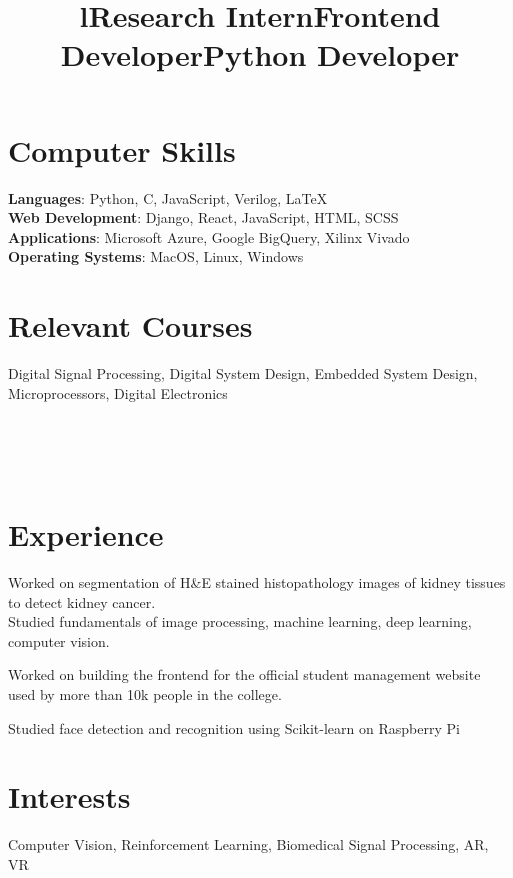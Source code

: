\documentclass[margin]{res}
\begin{document}
\begin{resume}
    \section{Computer Skills}
      \textbf{Languages}: Python, C, JavaScript, Verilog, \LaTeX
      \\
      \textbf{Web Development}: Django, React, JavaScript, HTML, SCSS
      \\
      \textbf{Applications}: Microsoft Azure, Google BigQuery, Xilinx Vivado
      \\
      \textbf{Operating Systems}: MacOS, Linux, Windows

    \section{Relevant Courses}
      Digital Signal Processing, Digital System Design, Embedded System Design,
      Microprocessors, Digital Electronics

    \begin{format}
      \title{l}\\
      \\
      \body\\
    \end{format}

    \section{Experience}
      \title{\textbf{Research Intern}}
      \begin{position}
        Worked on segmentation of H\&E stained histopathology images of kidney tissues to detect kidney cancer.\\
        Studied fundamentals of image processing, machine learning, deep learning, computer vision.
      \end{position}

      \title{\textbf{Frontend Developer}}
      \begin{position}
        Worked on building the frontend for the official student management website used by more than 10k people in the college.
      \end{position}

      \title{\textbf{Python Developer}}
      \begin{position}
        Studied face detection and recognition using Scikit-learn on Raspberry Pi
      \end{position}

    \section{Interests}
      Computer Vision, Reinforcement Learning, Biomedical Signal Processing, AR, VR
  \end{resume}
\end{document}
